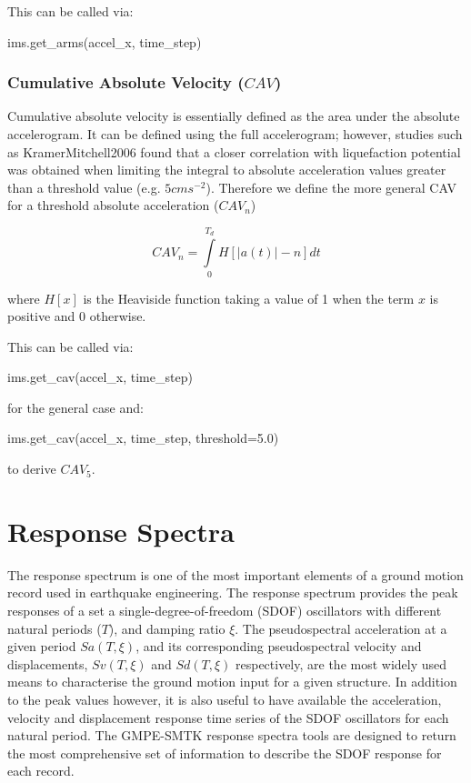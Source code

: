 This can be called via:

\begin{python}
ims.get_arms(accel_x, time_step)
\end{python}


\subsubsection{Cumulative Absolute Velocity ($CAV$)}

Cumulative absolute velocity is essentially defined as the area under the absolute accelerogram. It can be defined using the full accelerogram; however, studies such as KramerMitchell2006 found that a closer correlation with liquefaction potential was obtained when limiting the integral to absolute acceleration values greater than a threshold value (e.g. $5 cm s^{-2}$). Therefore we define the more general CAV for a threshold absolute acceleration ($CAV_n$)

\begin{equation}
CAV_n = \int\limits_0^{T_d} H\left[ {|a \left( t \right)| - n} \right] dt
\end{equation}

\noindent where $H\left[ x \right]$ is the Heaviside function taking a value of 1 when the term $x$ is positive and 0 otherwise.

This can be called via:

\begin{python}
ims.get_cav(accel_x, time_step)
\end{python}

\noindent for the general case and:

\begin{python}
ims.get_cav(accel_x, time_step, threshold=5.0)
\end{python}

to derive $CAV_5$.

\section{Response Spectra}
\label{sec:response_spectra}

The response spectrum is one of the most important elements of a ground motion record used in earthquake engineering. The response spectrum provides the peak responses of a set a single-degree-of-freedom (SDOF) oscillators with different natural periods ($T$), and damping ratio $\xi$. The pseudospectral acceleration at a given period $Sa \left({T, \xi} \right)$, and its corresponding pseudospectral velocity and displacements, $Sv \left( {T, \xi} \right)$ and $Sd \left( {T, \xi} \right)$ respectively, are the most widely used means to characterise the ground motion input for a given structure. In addition to the peak values however, it is also useful to have available the acceleration, velocity and displacement response time series of the SDOF oscillators for each natural period. The GMPE-SMTK response spectra tools are designed to return the most comprehensive set of information to describe the SDOF response for each record.

